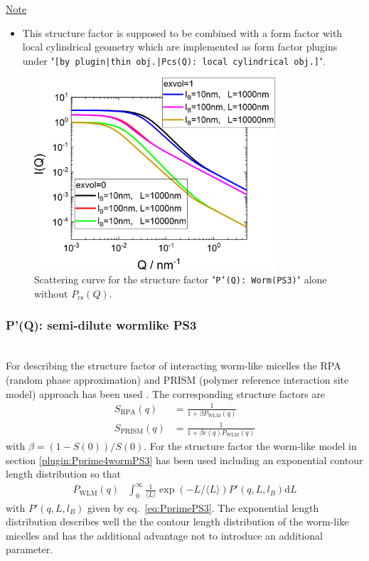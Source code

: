 \noindent
\uline{Note}
\begin{itemize}
  \item This structure factor is supposed to be combined with a form factor with local cylindrical geometry which are implemented as form factor plugins
under "\texttt{[by plugin|thin obj.|Pcs(Q): local cylindrical obj.]}".
\end{itemize}

\begin{figure}[htb]
\begin{center}
\includegraphics[width=0.8\textwidth]{../images/form_factor/polymer_semiflexible/PprimeWormPS3.png}
\end{center}
\caption{Scattering curve for the structure factor "\texttt{P'(Q): Worm(PS3)}" alone without $P_\mathrm{cs}(Q)$.}
\label{fig_IQ:PprimeWormPS3}
\end{figure}

\clearpage
\subsubsection{P'(Q): semi-dilute wormlike PS3} ~\\
\label{plugin:Pprime4interactingwormPS3}
For describing the structure factor of interacting worm-like micelles the
RPA (random phase approximation) and PRISM (polymer reference interaction site model) approach has been used \cite{Pedersen2004,Jerke1997,Cannavacciuolo2002,Cannavacciuolo2002a,Pedersen1999,Pedersen2008}. The corresponding structure factors are
\begin{align}
S_\mathrm{RPA}(q) &= \frac{1}{1+\beta P_\mathrm{WLM}(q)} \\
S_\mathrm{PRISM}(q)  &= \frac{1}{1+\beta c(q) P_\mathrm{WLM}(q)}
\end{align}
with $\beta=\left(1-S(0)\right)/S(0)$.
For the structure factor the worm-like model in section \ref{plugin:Pprime4wormPS3} has been used including an exponential contour length distribution so that
\begin{align}\label{eq:Pwlm}
  P_\mathrm{WLM}(q) & \int_0^\infty \frac{1}{\langle L\rangle}\exp\left(-L/\langle L\rangle\right) P'(q,L,l_B) \mathrm{d}L
\end{align}
with $ P'(q,L,l_B)$ given by eq.\ \ref{eq:PprimePS3}. The exponential length distribution describes well the the contour length distribution of the worm-like micelles and has the additional advantage not to introduce an additional parameter.

